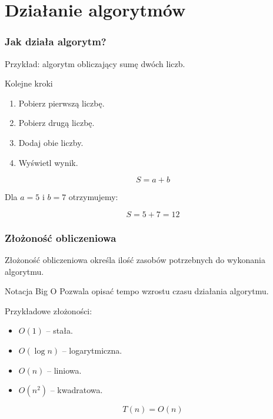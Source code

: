 \documentclass[ aspectratio=169 ]{beamer}
\begin{document}
\section{Działanie algorytmów}

\begin{frame}
    \frametitle{Jak działa algorytm?}

    Przykład: algorytm obliczający sumę dwóch liczb.

    \begin{block}{Kolejne kroki}
        \begin{enumerate}
            \item Pobierz pierwszą liczbę.
            \item Pobierz drugą liczbę.
            \item Dodaj obie liczby.
            \item Wyświetl wynik.
        \end{enumerate}
    \end{block}

    \[
        S = a + b
    \]

    Dla $a=5$ i $b=7$ otrzymujemy:

    \[
        S = 5+7=12
    \]
\end{frame}

\begin{frame}
    \frametitle{Złożoność obliczeniowa}

    Złożoność obliczeniowa określa ilość zasobów potrzebnych
    do wykonania algorytmu.

    \begin{block}{Notacja Big O}
        Pozwala opisać tempo wzrostu czasu działania algorytmu.
    \end{block}

    Przykładowe złożoności:

    \begin{itemize}
        \item $O(1)$ -- stała.
        \item $O(\log n)$ -- logarytmiczna.
        \item $O(n)$ -- liniowa.
        \item $O(n^2)$ -- kwadratowa.
    \end{itemize}

    \[
        T(n)=O(n)
    \]
\end{frame}
\end{document}
